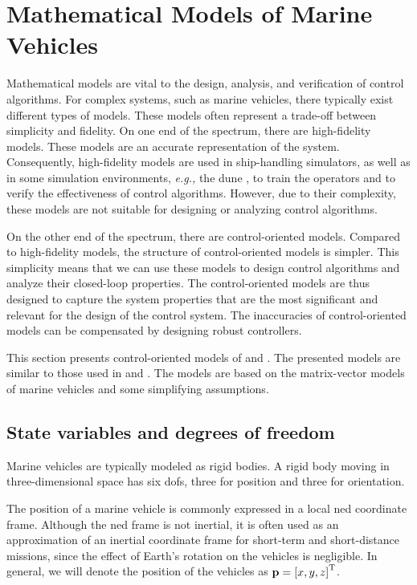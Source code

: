 \section{Mathematical Models of Marine Vehicles}
\label{sec:model}

Mathematical models are vital to the design, analysis, and verification of control algorithms.
For complex systems, such as marine vehicles, there typically exist different types of models.
These models often represent a trade-off between simplicity and fidelity.
On one end of the spectrum, there are high-fidelity models.
These models are an accurate representation of the system.
Consequently, high-fidelity models are used in ship-handling simulators, as well as in some simulation environments, \emph{e.g.,} the \gls{dune} \cite{dune}, to train the operators and to verify the effectiveness of control algorithms.
However, due to their complexity, these models are not suitable for designing or analyzing control algorithms.

On the other end of the spectrum, there are control-oriented models.
Compared to high-fidelity models, the structure of control-oriented models is simpler.
This simplicity means that we can use these models to design control algorithms and analyze their closed-loop properties.
The control-oriented models are thus designed to capture the system properties that are the most significant and relevant for the design of the control system.
The inaccuracies of control-oriented models can be compensated by designing robust controllers.

This section presents control-oriented models of  and .
The presented models are similar to those used in \cite{borhaug_straight_2007} and \cite{fredriksen_global_2006}.
The models are based on the matrix-vector models of marine vehicles \cite{fossen_handbook_2011} and some simplifying assumptions.

\subsection{State variables and degrees of freedom}
Marine vehicles are typically modeled as rigid bodies.
A rigid body moving in three-dimensional space has six \glspl{dof}, three for position and three for orientation.

The position of a marine vehicle is commonly expressed in a local \gls{ned} coordinate frame.
Although the \gls{ned} frame is not inertial, it is often used as an approximation of an inertial coordinate frame for short-term and short-distance missions, since the effect of Earth's rotation on the vehicles is negligible.
In general, we will denote the position of the vehicles as $\mathbf{p} = \left[x, y, z\right]^{\mathrm{T}}$.

